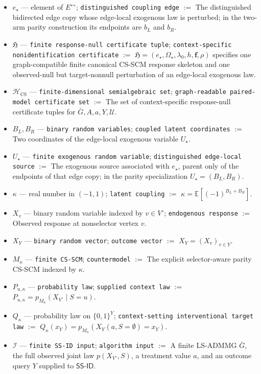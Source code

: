 \documentclass{article}
\begin{document}
\begin{itemize}
  \item \(e_\star\) --- element of \(E^{\leftrightarrow}\); \texttt{distinguished coupling edge} $:=$ The distinguished bidirected edge copy whose edge-local exogenous law is perturbed; in the two-arm parity construction its endpoints are \(b_L\) and \(b_R\).
  \item \(\mathfrak H\) --- \texttt{finite response-null certificate tuple}; \texttt{context-specific nonidentification certificate} $:=$ \(\mathfrak H=(e_\star,\Omega_\star,\lambda_0,h,\mathbf f,\rho)\) specifies one graph-compatible finite canonical CS-SCM response skeleton and one observed-null but target-nonnull perturbation of an edge-local exogenous law.
  \item \(\mathcal H_{\mathrm{CS}}\) --- \texttt{finite-dimensional semialgebraic set}; \texttt{graph-readable paired-model certificate set} $:=$ The set of context-specific response-null certificate tuples for \(\bar G,A,a,Y,\mathcal U\).
  \item \(B_L,B_R\) --- \texttt{binary random variables}; \texttt{coupled latent coordinates} $:=$ Two coordinates of the edge-local exogenous variable \(U_\star\).
  \item \(U_\star\) --- \texttt{finite exogenous random variable}; \texttt{distinguished edge-local source} $:=$ The exogenous source associated with \(e_\star\), parent only of the endpoints of that edge copy; in the parity specialization \(U_\star=(B_L,B_R)\).
  \item \(\kappa\) --- real number in \((-1,1)\); \texttt{latent coupling} $:=$ \(\kappa=\mathbb E[(-1)^{B_L+B_R}]\).
  \item \(X_v\) --- binary random variable indexed by \(v\in V^\circ\); \texttt{endogenous response} $:=$ Observed response at nonselector vertex \(v\).
  \item \(X_Y\) --- \texttt{binary random vector}; \texttt{outcome vector} $:=$ \(X_Y=(X_v)_{v\in Y}\).
  \item \(M_\kappa\) --- \texttt{finite CS-SCM}; \texttt{countermodel} $:=$ The explicit selector-aware parity CS-SCM indexed by \(\kappa\).
  \item \(P_{u,\kappa}\) --- \texttt{probability law}; \texttt{supplied context law} $:=$ \(P_{u,\kappa}=p_{M_\kappa}(X_{V^\circ}\mid S=u)\).
  \item \(Q_\kappa\) --- probability law on \(\{0,1\}^{Y}\); \texttt{context-setting interventional target law} $:=$ \(Q_\kappa(x_Y)=p_{M_\kappa}(X_Y(a,S=\emptyset)=x_Y)\).
  \item \(\mathcal I\) --- \texttt{finite SS-ID input}; \texttt{algorithm input} $:=$ A finite LS-ADMMG \(\bar G\), the full observed joint law \(p(X_{V^\circ},S)\), a treatment value \(a\), and an outcome query \(Y\) supplied to \(\mathsf{SS\text{-}ID}\).

\end{itemize}
\end{document}
